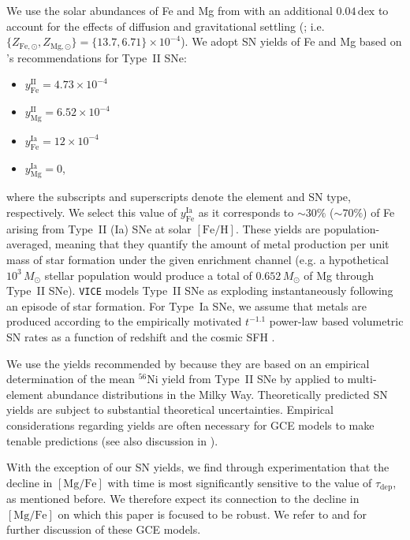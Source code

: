 \documentclass[twocolumn]{aastex631}
\newcommand{\Msun}{\ensuremath{M_{\odot}}}
\newcommand{\FeH}{\ensuremath{[\textrm{Fe}/\textrm{H}]}}
\newcommand{\MgFe}{\ensuremath{[\textrm{Mg}/\textrm{Fe}]}}
\newcommand{\dex}{\ensuremath{\textrm{dex}}}
\begin{document}
We use the solar abundances of Fe and Mg from \citet{Magg2022} with an additional $0.04\,\dex$ to account for the effects of diffusion and gravitational settling (\citealt{Turcotte1998}; i.e. $\{Z_{\text{Fe},\odot}, Z_{\text{Mg},\odot}\} = \{13.7, 6.71\} \times 10^{-4}$). We adopt SN yields of Fe and Mg based on \citeauthor{2024ApJ...973..122W}'s \citeyearpar{2024ApJ...973..122W} recommendations for Type~II SNe:
\begin{itemize}

	\item $y_\text{Fe}^\text{II} = 4.73 \times 10^{-4}$

	\item $y_\text{Mg}^\text{II} = 6.52 \times 10^{-4}$

	\item $y_\text{Fe}^\text{Ia} = 12 \times 10^{-4}$

	\item $y_\text{Mg}^\text{Ia} = 0$,

\end{itemize}
where the subscripts and superscripts denote the element and SN type, respectively. We select this value of $y_\text{Fe}^\text{Ia}$ as it corresponds to $\sim30\%$ ($\sim70\%$) of Fe arising from Type~II (Ia) SNe at solar \FeH{}. These yields are population-averaged, meaning that they quantify the amount of metal production per unit mass of star formation under the given enrichment channel (e.g. a hypothetical $10^3\,\Msun$ stellar population would produce a total of $0.652\,\Msun$ of Mg through Type~II SNe). {\tt VICE} models Type~II SNe as exploding instantaneously following an episode of star formation. For Type~Ia SNe, we assume that metals are produced according to the empirically motivated $t^{-1.1}$ power-law based volumetric SN rates as a function of redshift and the cosmic SFH \citep[e.g.][]{Maoz2012}.

We use the yields recommended by \citet{2024ApJ...973..122W} because they are based on an empirical determination of the mean $^{56}$Ni yield from Type~II SNe by \citet{Rodriguez2021, Rodriguez2023} applied to multi-element abundance distributions in the Milky Way. Theoretically predicted SN yields \citep[e.g.][]{Seitenzahl2013, Sukhbold2016, Limongi2018, Gronow2021} are subject to substantial theoretical uncertainties. Empirical considerations regarding yields are often necessary for GCE models to make tenable predictions (see also discussion in \citealt{Palla2022}).

With the exception of our SN yields, we find through experimentation that the decline in \MgFe{} with time is most significantly sensitive to the value of $\tau_{\textrm{dep}}$, as mentioned before. We therefore expect its connection to the decline in \MgFe{} on which this paper is focused to be robust. We refer to \citet{2020MNRAS.498.1364J} and \citet{2022arXiv220402989C} for further discussion of these GCE models.
\end{document}
